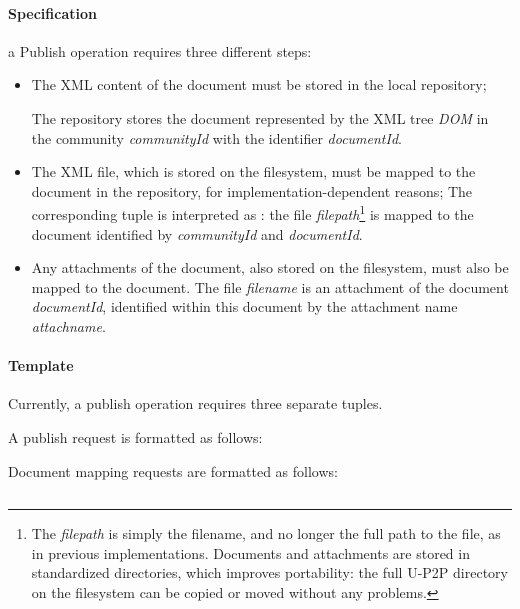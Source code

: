 \documentclass[titlepage]{article}%
\begin{document}
\paragraph{Specification}
a Publish operation requires three different steps:
\begin{itemize}
\item The XML content of the document must be stored in the local repository;

The repository stores the document represented by the XML tree \emph{DOM} in the community \emph{communityId} with the identifier \emph{documentId}. 

\item The XML file, which is stored on the filesystem, must be mapped to the document in the repository, for implementation-dependent reasons;
The corresponding tuple is interpreted as : the file \emph{filepath}\footnote{The \emph{filepath} is simply the filename, and no longer the full path to the file, as in previous implementations. Documents and attachments are stored in standardized directories, which improves portability: the full U-P2P directory on the filesystem can be copied or moved without any problems.} is mapped to the document identified by \emph{communityId} and \emph{documentId}. 

\item Any attachments of the document, also stored on the filesystem, must also be mapped to the document.
The file \emph{filename} is an attachment of the document \emph{documentId}, identified within this document by the attachment name \emph{attachname}.

\end{itemize}


\paragraph{Template}
Currently, a publish operation requires three separate tuples.

A publish request is formatted as follows:
\begin{equation*}
[\text{``PublishXML"}; communityId; documentId; DOM]
\end{equation*}

Document mapping requests are formatted as follows:

\begin{equation*}
[\text{``MapFile"}; communityId; documentId; filepath]
\end{equation*}
\end{document}
